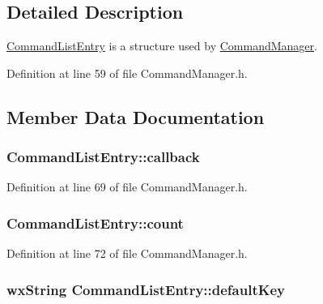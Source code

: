 \subsection{Detailed Description}
\hyperlink{struct_command_list_entry}{Command\+List\+Entry} is a structure used by \hyperlink{class_command_manager}{Command\+Manager}. 

Definition at line 59 of file Command\+Manager.\+h.



\subsection{Member Data Documentation}
\subsubsection[{\texorpdfstring{callback}{callback}}]{ Command\+List\+Entry\+::callback}\hypertarget{struct_command_list_entry_afb5bd4547fe82baa05f9a34e63943925}{}\label{struct_command_list_entry_afb5bd4547fe82baa05f9a34e63943925}


Definition at line 69 of file Command\+Manager.\+h.

\subsubsection[{\texorpdfstring{count}{count}}]{ Command\+List\+Entry\+::count}\hypertarget{struct_command_list_entry_a4397e2a5f445fddba7f5150aab86d111}{}\label{struct_command_list_entry_a4397e2a5f445fddba7f5150aab86d111}


Definition at line 72 of file Command\+Manager.\+h.

\subsubsection[{\texorpdfstring{default\+Key}{defaultKey}}]{\setlength{\rightskip}{0pt plus 5cm}wx\+String Command\+List\+Entry\+::default\+Key}\hypertarget{struct_command_list_entry_a14e611973a6059356d55db81fffff13a}{}\label{struct_command_list_entry_a14e611973a6059356d55db81fffff13a}


